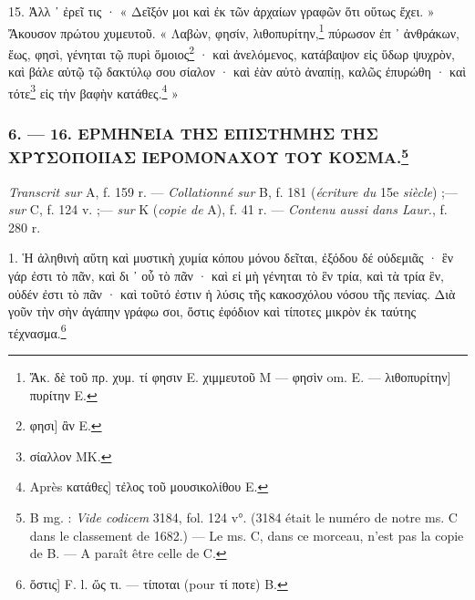 \documentclass[a4paper, 11pt, oneside, polutonikogreek, french]{article}
\begin{document}
15. Ἀλλ ᾽ ἐρεῖ τις · « Δεῖξόν μοι καὶ ἐκ τῶν ἀρχαίων γραφῶν ὅτι οὕτως ἔχει. » Ἄκουσον πρώτου χυμευτοῦ. « Λαβὼν, φησίν, λιθοπυρίτην,\footnote{Ἄκ. δὲ τοῦ πρ. χυμ. τί φησιν E. χιμμευτοῦ M --- φησὶν om. E. --- λιθοπυρίτην] πυρίτην E.} πύρωσον ἐπ ᾽ ἀνθράκων, ἕως, φησὶ, γένηται τῷ πυρὶ ὅμοιος\footnote{φησι] ἂν E.} · καὶ ἀνελόμενος, κατάβαψον εἰς ὕδωρ ψυχρὸν, καὶ βάλε αὐτῷ τῷ δακτύλῳ σου σίαλον · καὶ ἐὰν αὐτὸ ἀναπίῃ, καλῶς ἐπυρώθη · καὶ τότε\footnote{σίαλλον MK.} εἰς τὴν βαφὴν κατάθες.\footnote{Après κατάθες] τἐλος τοῦ μουσικολίθου E.} »

\bigskip
\centerline{\EightStarTaper}
\centerline{\EightStarTaper\EightStarTaper}
\bigskip

\subsubsection[6. --- 16. ΕΡΜΗΝΕΙΑ ΤΗΣ ΕΠΙΣΤΗΜΗΣ ΤΗΣ ΧΡΥΣΟΠΟΙΙΑΣ ΙΕΡΟΜΟΝΑΧΟΥ ΤΟΥ ΚΟΣΜΑ.]{6. --- 16. ΕΡΜΗΝΕΙΑ ΤΗΣ ΕΠΙΣΤΗΜΗΣ ΤΗΣ ΧΡΥΣΟΠΟΙΙΑΣ ΙΕΡΟΜΟΝΑΧΟΥ ΤΟΥ ΚΟΣΜΑ.\footnote{B mg. : \emph{Vide codicem} 3184, fol. 124 v°. (3184 était le numéro de notre ms. C dans le classement de 1682.) --- Le ms. C, dans ce morceau, n'est pas la copie de B. --- A paraît être celle de C.}}

\emph{Transcrit sur} A, f. 159 r. --- \emph{Collationné sur} B, f. 181 (\emph{écriture du} 15e \emph{siècle}) ;--- \emph{sur} C, f. 124 v. ;--- \emph{sur} Κ (\emph{copie de} A), f. 41 r. --- \emph{Contenu aussi dans Laur.}, f. 280 r.

1. Ἡ ἀληθινὴ αὕτη καὶ μυστικὴ χυμία κόπου μόνου δεῖται, ἐξόδου δέ οὐδεμιᾶς · ἓν γάρ ἐστι τὸ πᾶν, καὶ δι ᾽ οὗ τὸ πᾶν · καὶ εἰ μὴ γένηται τὸ ἓν τρία, καὶ τὰ τρία ἓν, οὐδέν ἐστι τὸ πᾶν · καὶ τοῦτό ἐστιν ἡ λύσις τῆς κακοσχόλου νόσου τῆς πενίας. Διὰ γοῦν τὴν σὴν ἀγάπην γράφω σοι, ὅστις ἐφόδιον καὶ τίποτες μικρὸν ἐκ ταύτης τέχνασμα.\footnote{ὅστις] F. l. ὥς τι. --- τίποται (pour τί ποτε) B.}
\end{document}
